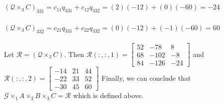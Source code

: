 \documentclass[12pt]{article}
\begin{document}
\\~\\$\left(\mathcal{Q}\times_3 C\right)_{331}=c_{11}q_{331}+c_{12}q_{332}=(2)(-12)+(0)(-60)=-24$
\\~\\$\left(\mathcal{Q}\times_3 C\right)_{332}=c_{21}q_{331}+c_{22}q_{332}=(0)(-12)+(-1)(-60)=60$
\\~\\Let $\mathcal{R}=\left(\mathcal{Q} \times_{3} C\right)$. Then $\mathcal{R}\left(:, :, 1\right)=\left[\begin{array}{ccc}{52} & {-78} & {8} \\ {68} & {-102} & {-8} \\ {84} & {-126} & {-24}\end{array}\right]$ and $\mathcal{R}\left(:, :, 2\right)=\left[\begin{array}{ccc}{-14} & {21} & {44} \\ {-22} & {33} & {52} \\ {-30} & {45} & {60}\end{array}\right]$
Finally, we can conclude that $\mathcal{G} \times_{1} A \times_{2} B \times_{3} C=\mathcal{R}$ which is defined above.
\end{document}
